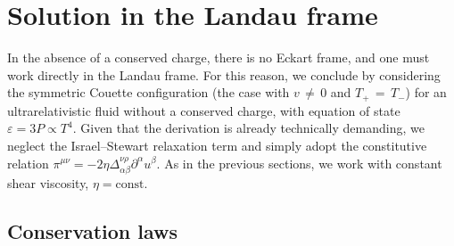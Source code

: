 \documentclass[a4paper, amsfonts, amssymb, amsmath, reprint, showkeys, nofootinbib, twoside,notitlepage,onecolumn]{revtex4-1}
\theoremstyle{definition}
\theoremstyle{theorem}
\begin{document}
\newpage
\section{Solution in the Landau frame}
\vspace{-0.2cm}
In the absence of a conserved charge,  there is no Eckart frame, and one must work directly in the Landau frame. For this reason, we conclude by considering the symmetric Couette configuration 
(the case with $v\,{\neq}\, 0$ and $T_+\,{=}\,T_-$) 
for an ultrarelativistic fluid without a conserved charge, with equation of state $\varepsilon=3P\propto T^{4}$. Given that the derivation is already technically demanding, we neglect the Israel–Stewart relaxation term and simply adopt  the constitutive relation $\pi^{\mu\nu}=-2\eta\Delta^{\nu\rho}_{\alpha\beta}\partial^\alpha u^\beta$. As in the previous sections, we work with constant shear viscosity, $\eta=\text{const}$. 


\vspace{-0.2cm}
\subsection{Conservation laws}
\vspace{-0.2cm}
\end{document}
